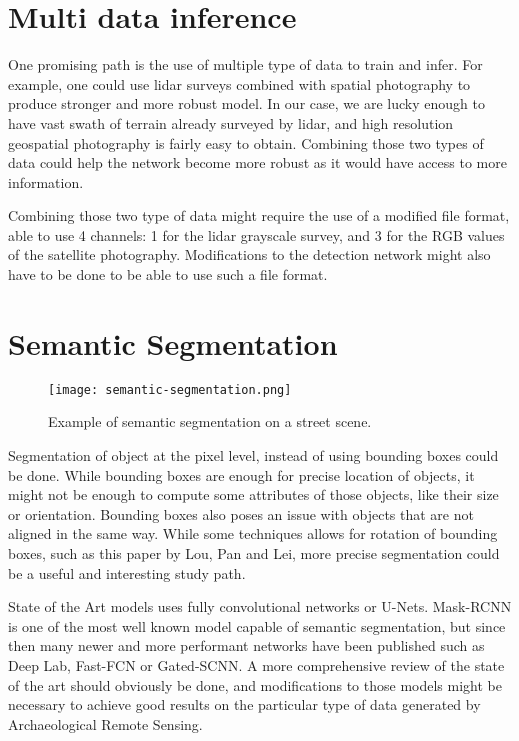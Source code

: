 \section{Multi data inference}
One promising path is the use of multiple type of data to train and infer. For example, one could use \gls{lidar} surveys combined with spatial photography to produce stronger and more robust model. In our case, we are lucky enough to have vast swath of terrain already surveyed by \gls{lidar}, and high resolution geospatial photography is fairly easy to obtain. Combining those two types of data could help the network become more robust as it would have access to more information. %

Combining those two type of data might require the use of a modified file format, able to use 4 channels: 1 for the \gls{lidar} grayscale survey, and 3 for the RGB values of the satellite photography. Modifications to the detection network might also have to be done to be able to use such a file format. 
\section{Semantic Segmentation}%

\begin{figure}[H]
  \centering
  \texttt{[image: semantic-segmentation.png]}
	\caption[]{Example of semantic segmentation on a street scene.}
  \label{fig:semSeg}
\end{figure}

Segmentation of object at the pixel level, instead of using bounding boxes could be done. While bounding boxes are enough for precise location of objects, it might not be enough to compute some attributes of those objects, like their size or orientation. Bounding boxes also poses an issue with objects that are not aligned in the same way. While some techniques allows for rotation of bounding boxes, such as this paper by Lou, Pan and Lei\cite{louPanLei2017}, more precise segmentation could be a useful and interesting study path. 

State of the Art models uses fully convolutional networks or U-Nets. Mask-RCNN\cite{maskrcnn} is one of the most well known model capable of semantic segmentation, but since then many newer and more performant networks have been published such as Deep Lab\cite{deepLab}, Fast-FCN\cite{fastFCN} or Gated-SCNN\cite{gated-scnn}. A more comprehensive review of the state of the art should obviously be done, and modifications to those models might be necessary to achieve good results on the particular type of data generated by Archaeological Remote Sensing.

